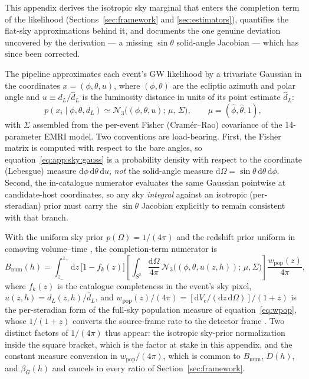 This appendix derives the isotropic sky marginal that enters the completion
term of the likelihood (Sections~\ref{sec:framework} and \ref{sec:estimators}),
quantifies the flat-sky approximations behind it, and documents the one genuine
deviation uncovered by the derivation --- a missing $\sin\theta$ solid-angle
Jacobian --- which has since been corrected.

The pipeline approximates each event's GW likelihood by a trivariate Gaussian
in the coordinates $x = (\phi, \theta, u)$, where $(\phi,\theta)$ are the
ecliptic azimuth and polar angle and $u \equiv d_L/\hat d_L$ is the luminosity
distance in units of its point estimate $\hat d_L$:
\begin{equation}
  p(x_i \mid \phi, \theta, d_L)
  \simeq \mathcal{N}_3\big((\phi,\theta,u);\,\mu,\,\Sigma\big),
  \qquad \mu = (\hat\phi, \hat\theta, 1),
  \label{eq:app:sky:gauss}
\end{equation}
with $\Sigma$ assembled from the per-event Fisher (Cram\'er--Rao) covariance of
the 14-parameter EMRI model. Two conventions are load-bearing. First, the
Fisher matrix is computed with respect to the bare angles, so
equation~\eqref{eq:app:sky:gauss} is a probability density with respect to the
coordinate (Lebesgue) measure $\mathrm{d}\phi\,\mathrm{d}\theta\,\mathrm{d}u$,
\emph{not} the solid-angle measure
$\mathrm{d}\Omega = \sin\theta\,\mathrm{d}\theta\,\mathrm{d}\phi$. Second, the
in-catalogue numerator evaluates the same Gaussian pointwise at candidate-host
coordinates, so any sky \emph{integral} against an isotropic (per-steradian)
prior must carry the $\sin\theta$ Jacobian explicitly to remain consistent
with that branch.

With the uniform sky prior $p(\Omega) = 1/(4\pi)$ and the redshift prior
uniform in comoving volume--time \citep{Gray:2019ksv}, the completion-term
numerator is
\begin{equation}
  B_\mathrm{num}(h) = \int_{z_-}^{z_+} \mathrm{d}z\, \big[1 - f_k(z)\big]
  \left[ \int_{S^2} \frac{\mathrm{d}\Omega}{4\pi}\,
  \mathcal{N}_3\big((\phi,\theta,u(z,h));\,\mu,\Sigma\big) \right]
  \frac{w_\mathrm{pop}(z)}{4\pi},
  \label{eq:app:sky:bnum}
\end{equation}
where $f_k(z)$ is the catalogue completeness in the event's sky pixel,
$u(z,h) = d_L(z,h)/\hat d_L$, and
$w_\mathrm{pop}(z)/(4\pi) =
[\mathrm{d}V_\mathrm{c}/(\mathrm{d}z\,\mathrm{d}\Omega)]/(1+z)$ is the
per-steradian form of the full-sky population measure of
equation~\eqref{eq:wpop}, whose $1/(1+z)$ converts the source-frame
rate to the detector frame \citep{Mandel:2018mve}. Two distinct
factors of $1/(4\pi)$ thus appear: the isotropic sky-prior
normalization inside the square bracket, which is the factor at stake
in this appendix, and the constant measure conversion in
$w_\mathrm{pop}/(4\pi)$, which is common to $B_\mathrm{num}$, $D(h)$,
and $\beta_{\bar G}(h)$ and cancels in every ratio of
Section~\ref{sec:framework}.

